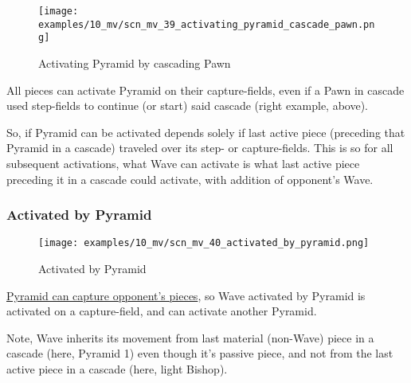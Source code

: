 \vspace*{-2.5\baselineskip}
\noindent
\begin{figure}[!h]
\texttt{[image: examples/10\_mv/scn\_mv\_39\_activating\_pyramid\_cascade\_pawn.png]}
\vspace*{-1.5\baselineskip}
\caption{Activating Pyramid by cascading Pawn}
\label{fig:scn_mv_39_activating_pyramid_cascade_pawn}
\end{figure}

\vspace*{-0.5\baselineskip}
All pieces can activate Pyramid on their capture-fields, even if a Pawn in cascade
used step-fields to continue (or start) said cascade (right example, above).

So, if Pyramid can be activated depends solely if last active piece (preceding that
Pyramid in a cascade) traveled over its step- or capture-fields. This is so for all
subsequent activations, what Wave can activate is what last active piece preceding
it in a cascade could activate, with addition of opponent's Wave.

\clearpage %

\subsubsection*{Activated by Pyramid}
\label{sec:Miranda's veil/Wave/Cascading Waves/Activated by Pyramid}

\vspace*{-1.4\baselineskip}
\noindent
\begin{figure}[!h]
\texttt{[image: examples/10\_mv/scn\_mv\_40\_activated\_by\_pyramid.png]}
\vspace*{-1.3\baselineskip}
\caption{Activated by Pyramid}
\label{fig:scn_mv_40_activated_by_pyramid}
\end{figure}

\vspace*{-0.3\baselineskip}
\hyperref[fig:scn_ma_02_pyramid_activated]{Pyramid can capture opponent's pieces},
so Wave activated by Pyramid is activated on a capture-field, and can activate
another Pyramid.

Note, Wave inherits its movement from last material (non-Wave) piece in a cascade
(here, Pyramid 1) even though it's passive piece, and not from the last active
piece in a cascade (here, light Bishop).

